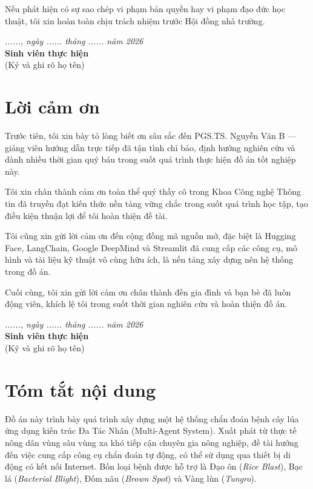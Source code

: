 \documentclass[13pt,a4paper]{extreport}
\begin{document}
Nếu phát hiện có sự sao chép vi phạm bản quyền hay vi phạm đạo đức học thuật, tôi xin hoàn toàn chịu trách nhiệm trước Hội đồng nhà trường.

\vspace{1.5cm}
\noindent \textit{......, ngày ...... tháng ...... năm 2026} \\[1cm]
\textbf{Sinh viên thực hiện} \\[1.5cm]
(Ký và ghi rõ họ tên)
\clearpage

\chapter*{Lời cảm ơn}
Trước tiên, tôi xin bày tỏ lòng biết ơn sâu sắc đến PGS.TS. Nguyễn Văn B --- giảng viên hướng dẫn trực tiếp đã tận tình chỉ bảo, định hướng nghiên cứu và dành nhiều thời gian quý báu trong suốt quá trình thực hiện đồ án tốt nghiệp này.

Tôi xin chân thành cảm ơn toàn thể quý thầy cô trong Khoa Công nghệ Thông tin đã truyền đạt kiến thức nền tảng vững chắc trong suốt quá trình học tập, tạo điều kiện thuận lợi để tôi hoàn thiện đề tài.

Tôi cũng xin gửi lời cảm ơn đến cộng đồng mã nguồn mở, đặc biệt là Hugging Face, LangChain, Google DeepMind và Streamlit đã cung cấp các công cụ, mô hình và tài liệu kỹ thuật vô cùng hữu ích, là nền tảng xây dựng nên hệ thống trong đồ án.

Cuối cùng, tôi xin gửi lời cảm ơn chân thành đến gia đình và bạn bè đã luôn động viên, khích lệ tôi trong suốt thời gian nghiên cứu và hoàn thiện đồ án.

\vspace{1cm}
\noindent \textit{......, ngày ...... tháng ...... năm 2026} \\[1cm]
\textbf{Sinh viên thực hiện} \\[1.5cm]
(Ký và ghi rõ họ tên)
\clearpage

\chapter*{Tóm tắt nội dung}

Đồ án này trình bày quá trình xây dựng một hệ thống chẩn đoán bệnh cây lúa ứng dụng kiến trúc Đa Tác Nhân (Multi-Agent System). Xuất phát từ thực tế nông dân vùng sâu vùng xa khó tiếp cận chuyên gia nông nghiệp, đề tài hướng đến việc cung cấp công cụ chẩn đoán tự động, có thể sử dụng qua thiết bị di động có kết nối Internet. Bốn loại bệnh được hỗ trợ là Đạo ôn (\textit{Rice Blast}), Bạc lá (\textit{Bacterial Blight}), Đốm nâu (\textit{Brown Spot}) và Vàng lùn (\textit{Tungro}).
\end{document}
